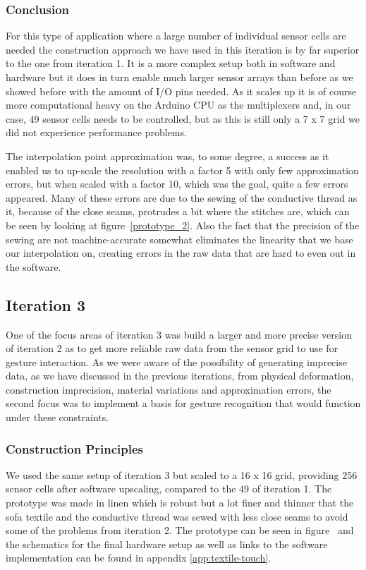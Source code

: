 \subsubsection{Conclusion}
For this type of application where a large number of individual sensor cells are needed the construction approach we have used in this iteration is by far superior to the one from iteration 1.
It is a more complex setup both in software and hardware but it does in turn enable much larger sensor arrays than before as we showed before with the amount of I/O pins needed.
As it scales up it is of course more computational heavy on the Arduino CPU as the multiplexers and, in our case, 49 sensor cells needs to be controlled, but as this is still only a 7 x 7 grid we did not experience performance problems.

The interpolation point approximation was, to some degree, a success as it enabled us to up-scale the resolution with a factor 5 with only few approximation errors, but when scaled with a factor 10, which was the goal, quite a few errors appeared.
Many of these errors are due to the sewing of the conductive thread as it, because of the close seams, protrudes a bit where the stitches are, which can be seen by looking at figure~\ref{prototype_2}.
Also the fact that the precision of the sewing are not machine-accurate somewhat eliminates the linearity that we base our interpolation on, creating errors in the raw data that are hard to even out in the software.

\subsection{Iteration 3}
\label{ch:textiletouch:it3}
One of the focus areas of iteration 3 was build a larger and more precise version of iteration 2 as to get more reliable raw data from the sensor grid to use for gesture interaction.
As we were aware of the possibility of generating imprecise data, as we have discussed in the previous iterations, from physical deformation, construction imprecision, material variations and approximation errors, the second focus was to implement a basis for gesture recognition that would function under these constraints.

\subsubsection{Construction Principles}
We used the same setup of iteration 3 but scaled to a 16 x 16 grid, providing 256 sensor cells after software upscaling, compared to the 49 of iteration 1.
The prototype was made in linen which is robust but a lot finer and thinner that the sofa textile and the conductive thread was sewed with less close seams to avoid some of the problems from iteration 2.
The prototype can be seen in figure~ and the schematics for the final hardware setup as well as links to the software implementation can be found in appendix \ref{app:textile-touch}.

